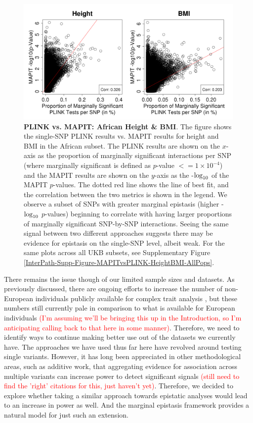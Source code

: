 \documentclass[12pt,a4paper]{article}
\def\log{{\rm log}}
\begin{document}
\begin{figure}[htb]
\centering
\includegraphics[scale=.45]{Images/Main/InterPath_Main_Figure_PLINKvsMAPIT_vs3_African_HeightBMI.png}
\caption[TBD]{\textbf{PLINK vs. MAPIT: African Height \& BMI}. The figure shows the single-SNP PLINK results vs. MAPIT results for height and BMI in the African subset. The PLINK results are shown on the $x$-axis as the proportion of marginally significant interactions per SNP (where marginally significant is defined as $p$-value $<= 1\times10^{-4}$) and the MAPIT results are shown on the $y$-axis as the -$\log_{10}$ of the MAPIT $p$-values. The dotted red line shows the line of best fit, and the correlation between the two metrics is shown in the legend. We observe a subset of SNPs with greater marginal epistasis (higher -$\log_{10}$ $p$-values) beginning to correlate with having larger proportions of marginally significant SNP-by-SNP interactions. Seeing the same signal between two different approaches suggests there may be evidence for epistasis on the single-SNP level, albeit weak. For the same plots across all UKB subsets, see Supplementary Figure \ref{InterPath-Supp-Figure-MAPITvsPLINK-HeightBMI-AllPops}.}
\label{InterPath-Main-Figure-PLINKvsMAPIT-HeightBMI-African}
\end{figure}

There remains the issue though of our limited sample sizes and datasets. As previously discussed, there are ongoing efforts to increase the number of non-European individuals publicly available for complex trait analysis \citep{Matise2011,Kowalski2019}, but these numbers still currently pale in comparison to what is available for European individuals \textcolor{red}{(I'm assuming we'll be bringing this up in the Introduction, so I'm anticipating calling back to that here in some manner)}. Therefore, we need to identify ways to continue making better use out of the datasets we currently have. The approaches we have used thus far here have revolved around testing single variants. However, it has long been appreciated in other methodological areas, such as additive work, that aggregating evidence for association across multiple variants can increase power to detect significant signals \textcolor{red}{(still need to find the 'right' citations for this, just haven't yet)}\citep{}. Therefore, we decided to explore whether taking a similar approach towards epistatic analyses would lead to an increase in power as well. And the marginal epistasis framework provides a natural model for just such an extension. 
\end{document}

